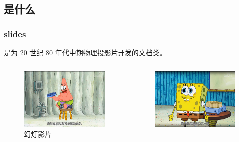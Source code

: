 \begin{shadedsection}

\section{是什么}

\begin{frame}
  \frametitle{slides}

   是为 20 世纪 80 年代中期物理投影片开发的文档类。

  \begin{columns}
    \begin{column}{0.33\textwidth}
      \begin{figure}
        \centering
        \begin{stampbox}[sjtuRedPrimary]
          \scriptsize
          \includegraphics[width=0.88\linewidth]{support/images/slides.jpg}
        \end{stampbox}
        \caption{幻灯影片}
      \end{figure}
    \end{column}
    \begin{column}{0.33\textwidth}
      \begin{figure}
        \centering
        \begin{stampbox}[sjtuRedPrimary]
          \scriptsize
          \includegraphics[width=0.88\linewidth]{support/images/screen.jpg}

\end{stampbox}
\end{figure}
\end{column}
\end{columns}
\end{frame}
\end{shadedsection}
